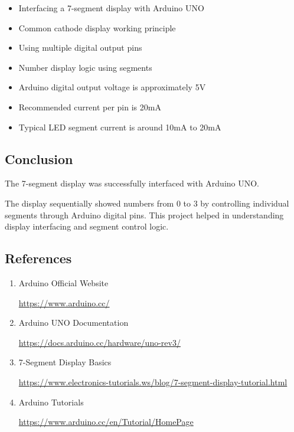 \begin{itemize}

\item Interfacing a 7-segment display with Arduino UNO

\item Common cathode display working principle

\item Using multiple digital output pins

\item Number display logic using segments

\item Arduino digital output voltage is approximately 5V

\item Recommended current per pin is 20mA

\item Typical LED segment current is around 10mA to 20mA

\end{itemize}


\subsection{Conclusion}

The 7-segment display was successfully interfaced with Arduino UNO.

The display sequentially showed numbers from 0 to 3 by controlling individual segments through Arduino digital pins. This project helped in understanding display interfacing and segment control logic.

\clearpage

\subsection{References}

\begin{enumerate}

\item Arduino Official Website

\url{https://www.arduino.cc/}

\item Arduino UNO Documentation

\url{https://docs.arduino.cc/hardware/uno-rev3/}

\item 7-Segment Display Basics

\url{https://www.electronics-tutorials.ws/blog/7-segment-display-tutorial.html}

\item Arduino Tutorials

\url{https://www.arduino.cc/en/Tutorial/HomePage}
\end{enumerate}

